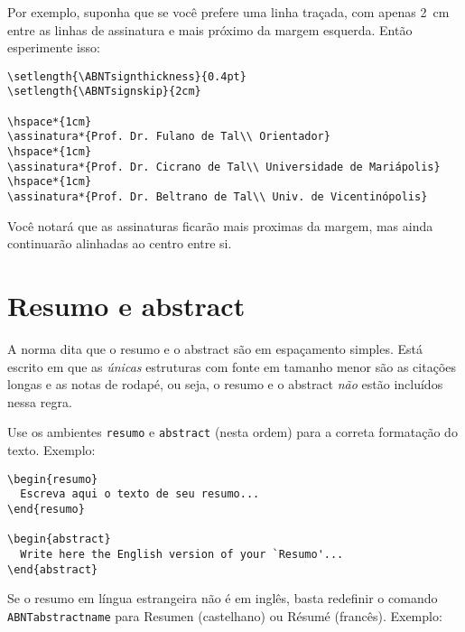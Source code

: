 \documentclass[espaco=simples,appendix=Name]{abnt}
\newcommand{\bs}{\symbol{92}}   %
\begin{document}
Por exemplo, suponha que se você prefere uma linha traçada, com apenas 2~cm
entre as linhas de assinatura e mais próximo da margem esquerda. Então
esperimente isso: 

\begin{verbatim}
\setlength{\ABNTsignthickness}{0.4pt}
\setlength{\ABNTsignskip}{2cm}

\hspace*{1cm}
\assinatura*{Prof. Dr. Fulano de Tal\\ Orientador}
\hspace*{1cm}
\assinatura*{Prof. Dr. Cicrano de Tal\\ Universidade de Mariápolis} 
\hspace*{1cm}
\assinatura*{Prof. Dr. Beltrano de Tal\\ Univ. de Vicentinópolis} 
\end{verbatim}

Você notará que as assinaturas ficarão mais proximas da margem, mas ainda
continuarão alinhadas ao centro entre si.



\section{Resumo e abstract}

A norma dita que o resumo e o abstract são em espaçamento simples. Está
escrito em \cite[51]{NBR14724:2001} que as \emph{únicas} estruturas com
fonte em tamanho menor são as citações longas e as notas de rodapé, ou
seja, o resumo e o abstract \emph{não} estão incluídos nessa regra.

Use os ambientes \texttt{resumo} e \texttt{abstract} (nesta ordem) para a
correta formatação do texto. Exemplo:

\begin{verbatim}
\begin{resumo}
  Escreva aqui o texto de seu resumo...
\end{resumo}

\begin{abstract}
  Write here the English version of your `Resumo'...
\end{abstract}
\end{verbatim}

Se o resumo em língua estrangeira não é em inglês, basta redefinir o
comando \texttt{\bs ABNTabstractname} para Resumen (castelhano) ou Résumé
(francês). Exemplo:
\end{document}
